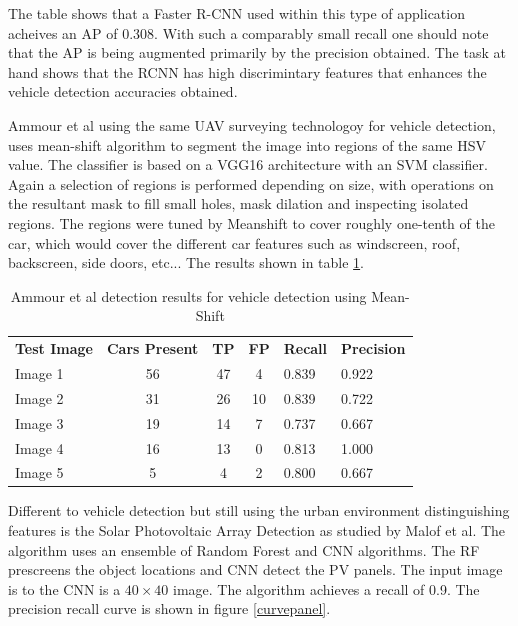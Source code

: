 \documentclass{IEEEtran}
\begin{document}
The table \cite{Zhong2017} shows that a Faster R-CNN used within this type of application acheives an AP of 0.308. With such a comparably small recall one should note that the AP is being augmented primarily by the precision obtained. The task at hand shows that the RCNN has high discrimintary features that enhances the vehicle detection accuracies obtained.\newline 


Ammour et al \cite{Ammour2017} using the same UAV surveying technologoy for vehicle detection, uses mean-shift algorithm to segment the image into regions of the same HSV value. The classifier is based on a VGG16 architecture with an SVM classifier. Again a selection of regions is performed depending on size, with operations on the resultant mask to fill small holes, mask dilation and inspecting isolated regions. The regions were tuned by Meanshift to cover roughly one-tenth of the car, which would cover the different car features such as windscreen, roof, backscreen, side doors, etc... The results shown in table \ref{meanshiftveh}.

\begin{table}[ht]
\centering
\caption{Ammour et al \cite{Ammour2017} detection results for vehicle detection using Mean-Shift}
\label{meanshiftveh}
\begin{tabular}{lcccll}
\textbf{Test Image} & \textbf{Cars Present} & \textbf{TP} & \textbf{FP} & \textbf{Recall} & \textbf{Precision} \\
Image 1             & 56                    & 47          & 4           & 0.839           & 0.922              \\
Image 2             & 31                    & 26          & 10          & 0.839           & 0.722              \\
Image 3             & 19                    & 14          & 7           & 0.737           & 0.667              \\
Image 4             & 16                    & 13          & 0           & 0.813           & 1.000              \\
Image 5             & 5                     & 4           & 2           & 0.800           & 0.667             
\end{tabular}
\end{table}

Different to vehicle detection but still using the urban environment distinguishing features is the Solar Photovoltaic Array Detection as studied by Malof et al\cite{Malof2016}. The algorithm uses an ensemble of Random Forest and CNN algorithms. The RF prescreens the object locations and CNN detect the PV panels. The input image is to the CNN is a $40 \times 40$ image. The algorithm achieves a recall of 0.9. The precision recall curve is shown in figure \ref{curvepanel}.
\end{document}
